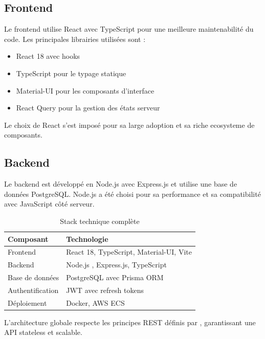 \subsection{Frontend}
Le frontend utilise React avec TypeScript pour une meilleure maintenabilité du code. Les principales librairies utilisées sont :
\begin{itemize}
	\item React 18 avec hooks \cite{react2024}
	\item TypeScript pour le typage statique
	\item Material-UI pour les composants d'interface
	\item React Query pour la gestion des états serveur
\end{itemize}

Le choix de React \cite{react2024} s'est imposé pour sa large adoption et sa riche ecosysteme de composants.

\subsection{Backend}
Le backend est développé en Node.js avec Express.js et utilise une base de données PostgreSQL. Node.js \cite{nodejs2024} a été choisi pour sa performance et sa compatibilité avec JavaScript côté serveur.

\begin{table}[H]
	\centering
	\caption{Stack technique complète}
	\begin{tabular}{p{6cm}p{8cm}}
		\toprule
		\textbf{Composant} & \textbf{Technologie} \\
		\midrule 
		Frontend & React 18, TypeScript, Material-UI, Vite \\
		Backend & Node.js \cite{nodejs2024}, Express.js, TypeScript \\ 
		Base de données & PostgreSQL avec Prisma ORM \\
		Authentification & JWT avec refresh tokens \\
		Déploiement & Docker, AWS ECS \\
		\bottomrule
	\end{tabular}
\end{table}

L'architecture globale respecte les principes REST définis par \cite{fielding2000rest}, garantissant une API stateless et scalable.